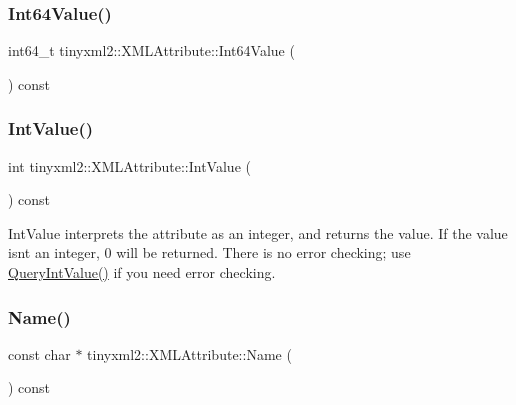 \subsubsection{\texorpdfstring{Int64\+Value()}{Int64Value()}}
{\footnotesize\ttfamily int64\+\_\+t tinyxml2\+::\+X\+M\+L\+Attribute\+::\+Int64\+Value (\begin{DoxyParamCaption}{ }\end{DoxyParamCaption}) const\hspace{0.3cm}{\ttfamily [inline]}}

\mbox{\label{classtinyxml2_1_1_x_m_l_attribute_adfa2433f0fdafd5c3880936de9affa80}} 
\subsubsection{\texorpdfstring{Int\+Value()}{IntValue()}}
{\footnotesize\ttfamily int tinyxml2\+::\+X\+M\+L\+Attribute\+::\+Int\+Value (\begin{DoxyParamCaption}{ }\end{DoxyParamCaption}) const\hspace{0.3cm}{\ttfamily [inline]}}

Int\+Value interprets the attribute as an integer, and returns the value. If the value isn\textquotesingle{}t an integer, 0 will be returned. There is no error checking; use \mbox{\hyperlink{classtinyxml2_1_1_x_m_l_attribute_a6d5176260db00ea301c01af8457cd993}{Query\+Int\+Value()}} if you need error checking. \mbox{\label{classtinyxml2_1_1_x_m_l_attribute_a5a5c135d24cce7abda6f17301c6274d8}} 
\subsubsection{\texorpdfstring{Name()}{Name()}}
{\footnotesize\ttfamily const char $\ast$ tinyxml2\+::\+X\+M\+L\+Attribute\+::\+Name (\begin{DoxyParamCaption}{ }\end{DoxyParamCaption}) const}



